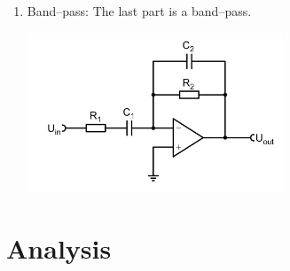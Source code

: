 \documentclass[a4paper,10pt]{article}
\newenvironment{Figure}
        {\par\medskip\noindent\minipage{\linewidth}}
        {\endminipage\par\medskip} %
\numberwithin{equation}{section}
\begin{document}
\begin{multicols}{2}
\begin{enumerate}[label=\arabic*]
\begin{Figure}
                        \end{Figure}
                \item Band--pass:
                        The last part is a band--pass.
                        \begin{Figure}
                                \centering
                                \includegraphics[width=0.6\textwidth]{bandpass.png}
                        \end{Figure}
        \end{enumerate}
        
        \clearpage
        \section{Analysis}


\end{multicols}

\clearpage
\listoffigures
\listoftables



\end{document}
